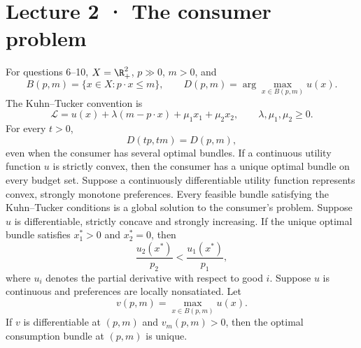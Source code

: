 \section*{Lecture 2 · The consumer problem}
For questions 6--10, $X=\R_+^2$, $p\gg0$, $m>0$, and
\[
 B(p,m)=\{x\in X:p\cdot x\le m\},\qquad
 D(p,m)=\arg\max_{x\in B(p,m)}u(x).
\]
The Kuhn--Tucker convention is
\[
 \mathcal L=u(x)+\lambda(m-p\cdot x)+\mu_1x_1+\mu_2x_2,
 \qquad\lambda,\mu_1,\mu_2\ge0.
\]
For every $t>0$,
\[
 D(tp,tm)=D(p,m),
\]
even when the consumer has several optimal bundles.
If a continuous utility function $u$ is strictly convex, then the consumer has a unique optimal bundle on every budget set.
Suppose a continuously differentiable utility function represents convex, strongly monotone preferences. Every feasible bundle satisfying the Kuhn--Tucker conditions is a global solution to the consumer's problem.
Suppose $u$ is differentiable, strictly concave and strongly increasing. If the unique optimal bundle satisfies $x_1^*>0$ and $x_2^*=0$, then
\[
 \frac{u_2(x^*)}{p_2}<\frac{u_1(x^*)}{p_1},
\]
where $u_i$ denotes the partial derivative with respect to good $i$.
Suppose $u$ is continuous and preferences are locally nonsatiated. Let
\[
 v(p,m)=\max_{x\in B(p,m)}u(x).
\]
If $v$ is differentiable at $(p,m)$ and $v_m(p,m)>0$, then the optimal consumption bundle at $(p,m)$ is unique.
